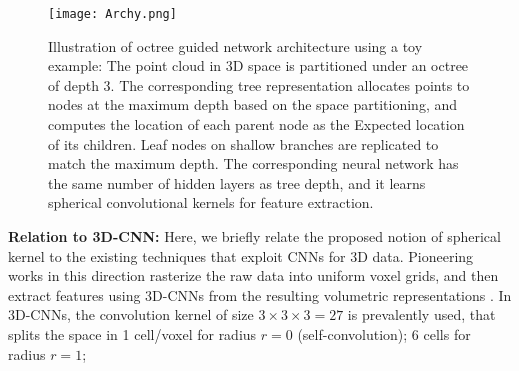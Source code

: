 \documentclass[10pt,twocolumn,letterpaper]{article}
\begin{document}
\begin{comment}
\begin{figure}
  \centering
   {\texttt{[image: lemma\_examples.png]}\label{LemmaExamples}}
  \caption{{\color{blue}Examples of divisions that violate the asymmetry. Here the red cross ${\bf x}_a$ represents the target point, while the green cross ${\bf x}_b$ is one of its neighborhood. The magenta sphere represents the spherical neighborhood range of ${\bf x}_a$, and the black curves represent divisions along $\theta$/$\phi$ directions.
  (a) The spherical space is not divided at all, which results in a single weight matrix to be defined in the kernel and applied to any two points ${\bf x}_a$ and ${\bf x}_b$ symmetrically. (b) 
  Let $\Phi=[-\frac{\pi}{2},\frac{\pi}{2}]$. There will be no divisions along the $\phi$ direction, which results in a particular weight matrix to be symmetrically applied to 
  points ${\bf x}_a$ and ${\bf x}_b$ on the $z$-$axis$ or its parallels (the blue arrow line). (c) 
  Let $\Theta=[-\pi,0,\pi]$, that is, $n=2$. The $\theta$ direction will be divided into two bins, which subtly results in   
points ${\bf x}_a$, ${\bf x}_b$ on the $x$-$axis$ and its parallels to share weights in a certain bin with $\theta\in[0,\pi]$ symmetrically.}} 
\end{figure}
\end{comment}
\begin{figure*}
  \centering
 {\texttt{[image: Archy.png]}\label{octree}}
  \caption{Illustration of octree guided network architecture using a toy example: The point cloud in 3D space  is partitioned under an octree of depth 3. The corresponding tree representation allocates points to nodes at the maximum depth based on the  space partitioning, and computes the location of each parent node as the Expected location of its children. Leaf nodes on shallow branches are replicated to match the maximum depth.  The corresponding neural network has the same number of hidden layers as tree depth, and it learns spherical convolutional kernels for feature extraction.}
\label{fig:network}
  \vspace{-3mm}
\end{figure*}
\vspace{-3mm}
\noindent \textbf{Relation to 3D-CNN:}
Here, we briefly relate the proposed notion of spherical kernel  to the existing techniques that exploit CNNs for 3D data. Pioneering works in this direction  rasterize the raw  data into uniform voxel grids, and then
extract features using 3D-CNNs from the resulting volumetric representations \cite{maturana2015voxnet,wu20153d}. In 3D-CNNs, the convolution kernel of size $3\times3\times3=27$ is prevalently used, that  splits the space in 1 cell/voxel for radius $r=0$ (self-convolution); 6 cells for radius $r=1$;
\end{document}
